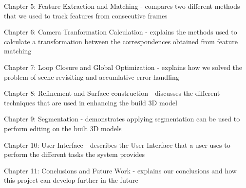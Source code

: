 \hbox{}
Chapter 5: Feature Extraction and Matching - compares two different methods that we used to track features from consecutive frames

\hbox{}
Chapter 6: Camera Tranformation Calculation - explains the methods used to calculate a transformation between the correspondences obtained from feature matching

\hbox{}
Chapter 7: Loop Closure and Global Optimization - explains how we solved the problem of scene revisiting and accumlative error handling

\hbox{}
Chapter 8: Refinement and Surface construction - discusses the different techniques that are used in enhancing the build 3D model

\hbox{}
Chapter 9: Segmentation - demonstrates applying segmentation can be used to perform editing on the built 3D models

\hbox{}
Chapter 10: User Interface - describes the User Interface that a user uses to perform the different tasks the system provides

\hbox{}
Chapter 11: Conclusions and Future Work - explains our conclusions and how this project can develop further in the future

